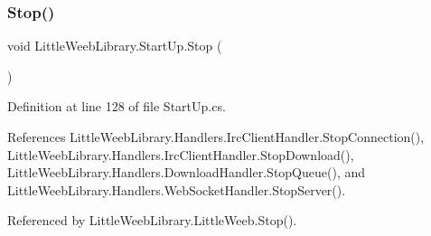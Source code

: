 \subsubsection{\texorpdfstring{Stop()}{Stop()}}
{\footnotesize\ttfamily void Little\+Weeb\+Library.\+Start\+Up.\+Stop (\begin{DoxyParamCaption}{ }\end{DoxyParamCaption})}



Definition at line 128 of file Start\+Up.\+cs.



References Little\+Weeb\+Library.\+Handlers.\+Irc\+Client\+Handler.\+Stop\+Connection(), Little\+Weeb\+Library.\+Handlers.\+Irc\+Client\+Handler.\+Stop\+Download(), Little\+Weeb\+Library.\+Handlers.\+Download\+Handler.\+Stop\+Queue(), and Little\+Weeb\+Library.\+Handlers.\+Web\+Socket\+Handler.\+Stop\+Server().



Referenced by Little\+Weeb\+Library.\+Little\+Weeb.\+Stop().


